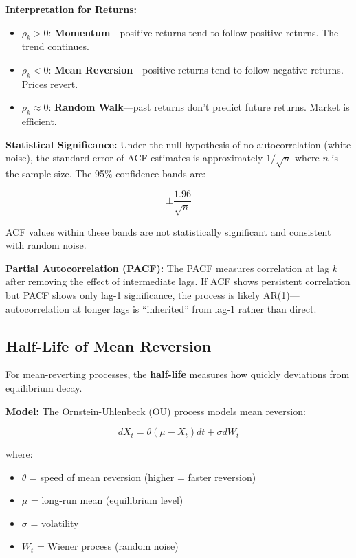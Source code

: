 \textbf{Interpretation for Returns:}
\begin{itemize}
    \item $\rho_k > 0$: \textbf{Momentum}---positive returns tend to follow positive returns. The trend continues.
    \item $\rho_k < 0$: \textbf{Mean Reversion}---positive returns tend to follow negative returns. Prices revert.
    \item $\rho_k \approx 0$: \textbf{Random Walk}---past returns don't predict future returns. Market is efficient.
\end{itemize}

\textbf{Statistical Significance:} Under the null hypothesis of no autocorrelation (white noise), the standard error of ACF estimates is approximately $1/\sqrt{n}$ where $n$ is the sample size. The 95\% confidence bands are:

\begin{equation}
\pm \frac{1.96}{\sqrt{n}}
\end{equation}

ACF values within these bands are not statistically significant and consistent with random noise.

\textbf{Partial Autocorrelation (PACF):} The PACF measures correlation at lag $k$ after removing the effect of intermediate lags. If ACF shows persistent correlation but PACF shows only lag-1 significance, the process is likely AR(1)---autocorrelation at longer lags is ``inherited'' from lag-1 rather than direct.

\subsection{Half-Life of Mean Reversion}
\label{method:halflife-appendix}

For mean-reverting processes, the \textbf{half-life} measures how quickly deviations from equilibrium decay.

\textbf{Model:} The Ornstein-Uhlenbeck (OU) process models mean reversion:

\begin{equation}
dX_t = \theta(\mu - X_t)dt + \sigma dW_t
\end{equation}

where:
\begin{itemize}
    \item $\theta$ = speed of mean reversion (higher = faster reversion)
    \item $\mu$ = long-run mean (equilibrium level)
    \item $\sigma$ = volatility
    \item $W_t$ = Wiener process (random noise)
\end{itemize}

